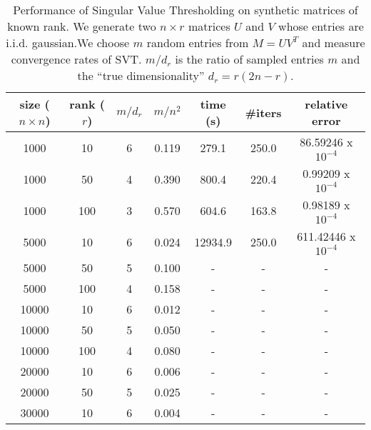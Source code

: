 \begin{table}[H!]
\centering
\begin{tabular}{|c|c|c|c|c|c|c|}
\hline
size ($n \times n$) & rank ($r$) & $m/d_r$ & $m/n^2$ & time (s) & \#iters & relative error \\
\hline
1000 & 10 & 6 & 0.119 & 279.1 & 250.0 & 86.59246 x $10^{-4}$ \\
\hline
1000 & 50 & 4 & 0.390 & 800.4 & 220.4 & 0.99209 x $10^{-4}$ \\
\hline
1000 & 100 & 3 & 0.570 & 604.6 & 163.8 & 0.98189 x $10^{-4}$ \\
\hline
5000 & 10 & 6 & 0.024 & 12934.9 & 250.0 & 611.42446 x $10^{-4}$ \\
\hline
5000 & 50 & 5 & 0.100 & - & - & - \\
\hline
5000 & 100 & 4 & 0.158 & - & - & - \\
\hline
10000 & 10 & 6 & 0.012 & - & - & - \\
\hline
10000 & 50 & 5 & 0.050 & - & - & - \\
\hline
10000 & 100 & 4 & 0.080 & - & - & - \\
\hline
20000 & 10 & 6 & 0.006 & - & - & - \\
\hline
20000 & 50 & 5 & 0.025 & - & - & - \\
\hline
30000 & 10 & 6 & 0.004 & - & - & - \\
\hline
\end{tabular}
\caption{Performance of Singular Value Thresholding on synthetic matrices of known rank. We generate two $n\times r$ matrices $U$ and $V$ whose entries are i.i.d. gaussian.We choose $m$ random entries from $M = U V^T$ and measure convergence rates of SVT. $m/d_r$ is the ratio of sampled entries $m$ and the ``true dimensionality'' $d_r = r(2n-r)$.}
\label{table:svt_synth_1}
\end{table}
